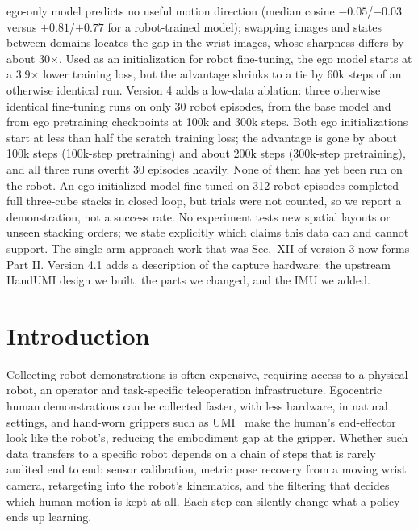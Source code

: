 \documentclass[conference,10pt]{IEEEtran}
\begin{document}
{ego-only model predicts no useful motion direction (median cosine $-0.05$/$-0.03$ versus $+0.81$/$+0.77$ for a robot-trained
model); swapping images and states between domains locates the gap in the wrist images, whose sharpness differs by about
30$\times$. Used as an initialization for robot fine-tuning, the ego model starts at a 3.9$\times$ lower training loss, but the advantage
shrinks to a tie by 60k steps of an otherwise identical run. Version 4 adds a low-data ablation: three otherwise identical
fine-tuning runs on only 30 robot episodes, from the base model and from ego pretraining checkpoints at 100k and 300k steps.
Both ego initializations start at less than half the scratch training loss; the advantage is gone by about 100k steps
(100k-step pretraining) and about 200k steps (300k-step pretraining), and all three runs overfit 30 episodes heavily. None of
them has yet been run on the robot. An ego-initialized model fine-tuned on 312 robot episodes completed full three-cube
stacks in closed loop, but trials were not counted, so we report a demonstration, not a success rate. No experiment tests
new spatial layouts or unseen stacking orders; we state explicitly which claims this data can and cannot support. The
single-arm approach work that was Sec.~XII of version 3 now forms Part II. Version 4.1 adds a description of the capture
hardware: the upstream HandUMI design we built, the parts we changed, and the IMU we added.}
\section{Introduction}\label{p1:sec:intro}
Collecting robot demonstrations is often expensive, requiring access to a physical robot, an operator and task-specific
teleoperation infrastructure. Egocentric human
demonstrations can be collected faster, with less hardware, in natural settings, and hand-worn grippers such as UMI~\cite{chi2024umi}
make the human's end-effector look like the robot's, reducing the embodiment gap at the gripper. Whether such data
transfers to a specific robot depends on a chain of steps that is rarely audited end to end: sensor calibration, metric pose
recovery from a moving wrist camera, retargeting into the robot's kinematics, and the filtering that decides which human motion
is kept at all. Each step can silently change what a policy ends up learning.
\end{document}
